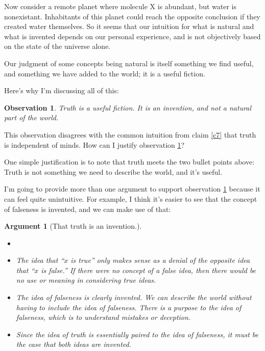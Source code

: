 \documentclass[11pt, oneside]{article}   	%
\newtheorem{obs}{Observation}
\newtheorem{argt}{Argument}
\begin{document}
Now consider a remote planet where molecule X is abundant, but water is
nonexistant. Inhabitants of this planet could reach the opposite conclusion if
they created water themselves. So it seems that our intuition for what is
natural and what is invented depends on our personal experience, and is
not objectively based on the state of the universe alone.

Our judgment of some concepts being natural is itself something
we find useful, and something we have added to the world; it is a useful
fiction.

Here's why I'm discussing all of this:
\begin{obs}\label{o3}
    Truth is a useful fiction. It is an invention, and not a natural part of the
    world.
\end{obs}

This observation disagrees with the common intuition from claim \ref{c7} that
truth is independent of minds. How can I justify observation \ref{o3}?

One simple justification is to note that truth meets the two bullet points
above: Truth is not something we need to describe the world, and it's useful.

I'm going to provide more than one argument to support observation \ref{o3}
because it can feel quite unintuitive.
For example, I think it's easier to see that the concept
of falseness is invented, and we can make use of that:
\begin{argt}[That truth is an invention.]\label{a2}
    \normalfont
    \begin{itemize}
        \item[]
        \item
    The idea that ``$x$ is true'' only makes sense as a denial of the opposite
    idea that ``$x$ is false.'' If there were no concept of a false idea, then
            there would be no use or meaning in considering true ideas.
        \item
            The idea of falseness is clearly invented. We can describe
            the world without having to include the idea of falseness.
            There is a purpose to the idea of falseness, which is to understand
            mistakes or deception.
        \item
            Since the idea of truth is essentially paired to the idea of
            falseness,
            it must be the case that both ideas are invented.
    \end{itemize}
\end{argt}
\end{document}
